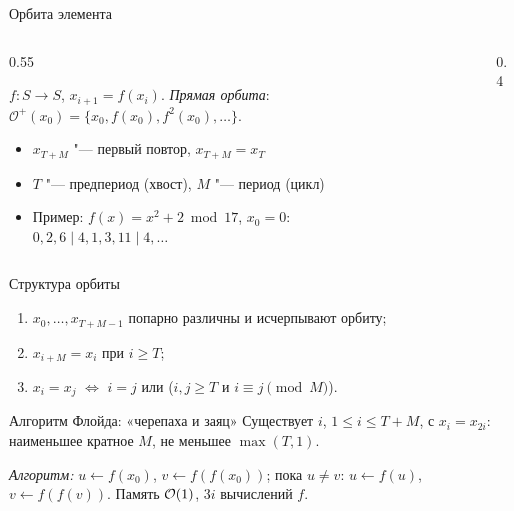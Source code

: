 \documentclass{ca-slides}
\begin{document}
\begin{canvasframe}{Орбита элемента}
  \begin{columns}[T]
    \begin{column}{0.55\textwidth}
      \begin{definition}
        $f\colon S \to S$, $x_{i+1} = f(x_i)$. \emph{Прямая орбита}:
        $\mathcal{O}^+(x_0) = \{x_0, f(x_0), f^2(x_0), \dots\}$.
      \end{definition}
      \begin{itemize}
        \item $x_{T+M}$ "--- первый повтор, $x_{T+M} = x_T$
        \item $T$ "--- предпериод (хвост), $M$ "--- период (цикл)
        \item Пример: $f(x) = x^2 + 2 \bmod 17$, $x_0 = 0$:\\
          $0, 2, 6 \mid 4, 1, 3, 11 \mid 4, \dots$
      \end{itemize}
    \end{column}
    \begin{column}{0.4\textwidth}
      \centering
    \end{column}
  \end{columns}
\end{canvasframe}

\begin{theoremframe}{Структура орбиты}
  \begin{enumerate}
    \item $x_0, \dots, x_{T+M-1}$ попарно различны и исчерпывают орбиту;
    \item $x_{i+M} = x_i$ при $i \ge T$;
    \item $x_i = x_j$ $\iff$ $i = j$ или ($i, j \ge T$ и $i \equiv j \pmod M$).
  \end{enumerate}
\end{theoremframe}

\begin{theoremframe}{Алгоритм Флойда: «черепаха и заяц»}
  Существует $i$, $1 \le i \le T + M$, с $x_i = x_{2i}$: наименьшее кратное $M$,
  не меньшее $\max(T, 1)$.
  \smallskip

  \emph{Алгоритм:} $u \gets f(x_0)$, $v \gets f(f(x_0))$; пока $u \ne v$:
  $u \gets f(u)$, $v \gets f(f(v))$. Память $\mathcal{O}(1)$, $3i$ вычислений $f$.
\end{theoremframe}
\end{document}
